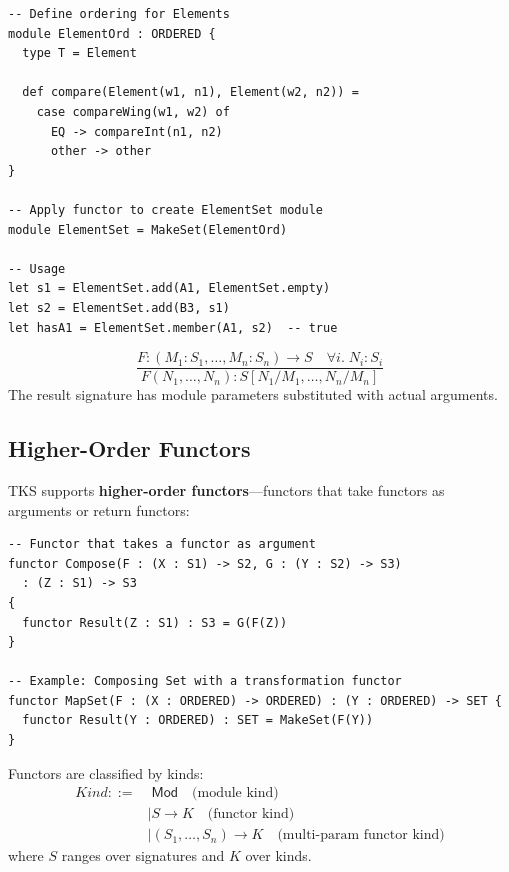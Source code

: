 \begin{example}
\label{ex:functor-app}
\begin{verbatim}
-- Define ordering for Elements
module ElementOrd : ORDERED {
  type T = Element

  def compare(Element(w1, n1), Element(w2, n2)) =
    case compareWing(w1, w2) of
      EQ -> compareInt(n1, n2)
      other -> other
}

-- Apply functor to create ElementSet module
module ElementSet = MakeSet(ElementOrd)

-- Usage
let s1 = ElementSet.add(A1, ElementSet.empty)
let s2 = ElementSet.add(B3, s1)
let hasA1 = ElementSet.member(A1, s2)  -- true
\end{verbatim}
\end{example}

\begin{definition}
\label{def:functor-app-typing}
\[
\frac{F : (M_1 : S_1, \ldots, M_n : S_n) \to S \quad \forall i.\; N_i : S_i}
     {F(N_1, \ldots, N_n) : S[N_1/M_1, \ldots, N_n/M_n]}
\]
The result signature has module parameters substituted with actual arguments.
\end{definition}

\subsection{Higher-Order Functors}
\label{subsec:higher-order-functors}

\begin{definition}
\label{def-ho-functor}
TKS supports \textbf{higher-order functors}---functors that take functors as arguments or return functors:
\begin{verbatim}
-- Functor that takes a functor as argument
functor Compose(F : (X : S1) -> S2, G : (Y : S2) -> S3)
  : (Z : S1) -> S3
{
  functor Result(Z : S1) : S3 = G(F(Z))
}

-- Example: Composing Set with a transformation functor
functor MapSet(F : (X : ORDERED) -> ORDERED) : (Y : ORDERED) -> SET {
  functor Result(Y : ORDERED) : SET = MakeSet(F(Y))
}
\end{verbatim}
\end{definition}

\begin{definition}
\label{def:functor-kinds}
Functors are classified by kinds:
\begin{align}
\mathit{Kind} ::=&\; \mathsf{Mod} \quad \text{(module kind)} \\
    &\mid S \to K \quad \text{(functor kind)} \\
    &\mid (S_1, \ldots, S_n) \to K \quad \text{(multi-param functor kind)}
\end{align}
where $S$ ranges over signatures and $K$ over kinds.
\end{definition}

